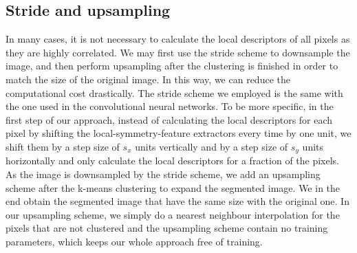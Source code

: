 \documentclass[twocolumn,amsmath, floatfix]{revtex4}
\begin{document}
\subsection{Stride and upsampling}
In many cases, it is not necessary to calculate the local descriptors of all pixels as they are highly correlated. We may first use the stride scheme to downsample the image, and then perform upsampling after the clustering is finished in order to match the size of the original image. In this way, we can reduce the computational cost drastically.  The stride scheme we employed is the same with the one used in the convolutional neural networks. To be more specific,  in the first step of our approach,
instead of calculating the local descriptors for each pixel by shifting the local-symmetry-feature extractors every time by one unit, we shift them by a step size of $s_x$ units vertically and by a step size of $s_y$ units horizontally and only calculate the local descriptors for a fraction of the pixels. As the image is downsampled by the stride scheme, we add an upsampling scheme after the k-means clustering to expand the segmented image. We in the end obtain the segmented image that have the same size with the original one. In our upsampling scheme, we simply do a nearest neighbour  interpolation for the pixels that are not clustered and the upsampling scheme contain no training parameters, which keeps our whole approach free of training.  
\end{document}
